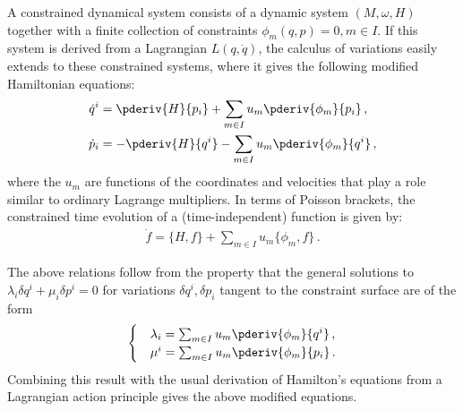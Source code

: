     A constrained dynamical system consists of a dynamic system $(M,\omega,H)$ together with a finite collection of constraints $\phi_m(q,p)=0,m\in I$. If this system is derived from a Lagrangian $L(q,\dot{q})$, the calculus of variations easily extends to these constrained systems, where it gives the following modified Hamiltonian equations:
    \begin{align}
        \dot{q}^i &= \pderiv{H}{p_i} + \sum_{m\in I}u_m\pderiv{\phi_m}{p_i}\,,\\
        \dot{p}_i &= -\pderiv{H}{q^i} - \sum_{m\in I}u_m\pderiv{\phi_m}{q^i}\,,
    \end{align}
    where the $u_m$ are functions of the coordinates and velocities that play a role similar to ordinary Lagrange multipliers. In terms of Poisson brackets, the constrained time evolution of a (time-independent) function is given by:
    \begin{gather}
        \label{constraint:modified_poisson_evolution}
        \dot{f} = \{H,f\} + \sum_{m\in I}u_m\{\phi_m,f\}\,.
    \end{gather}

    \begin{remark}
        The above relations follow from the property that the general solutions to $\lambda_i\delta q^i + \mu_i\delta p^i = 0$ for variations $\delta q^i,\delta p_i$ tangent to the constraint surface are of the form
        \begin{gather}
            \begin{cases}
                &\lambda_i = \sum_{m\in I}u_m\pderiv{\phi_m}{q^i}\,,\\
                &\mu^i = \sum_{m\in I}u_m\pderiv{\phi_m}{p_i}\,.
            \end{cases}
        \end{gather}
        Combining this result with the usual derivation of Hamilton's equations from a Lagrangian action principle gives the above modified equations.
    \end{remark}

